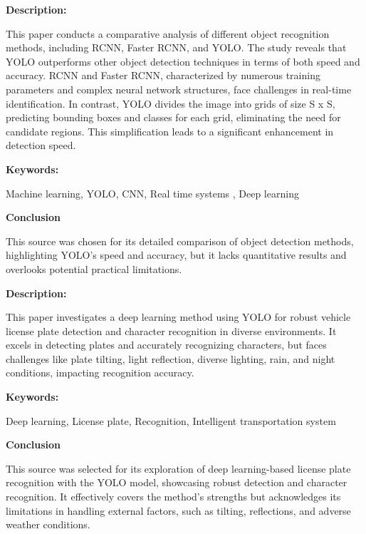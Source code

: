 %
%
%
%




{ 
	
	\textbf{Description:}
	
	This paper conducts a comparative analysis of different object recognition methods, including RCNN, Faster RCNN, and YOLO. The study reveals that YOLO outperforms other object detection techniques in terms of both speed and accuracy. RCNN and Faster RCNN, characterized by numerous training parameters and complex neural network structures, face challenges in real-time identification. In contrast, YOLO divides the image into grids of size S x S, predicting bounding boxes and classes for each grid, eliminating the need for candidate regions. This simplification leads to a significant enhancement in detection speed.\autocite{Xie:2018}

	
	\textbf{Keywords:} 
	
	Machine learning, YOLO, CNN, Real time systems , Deep learning
	
	\textbf{Conclusion} 
	
	This source was chosen for its detailed comparison of object detection methods, highlighting YOLO's speed and accuracy, but it lacks quantitative results and overlooks potential practical limitations.
	}



{ 
	
	\textbf{Description:}
	
	This paper investigates a deep learning method using YOLO for robust vehicle license plate detection and character recognition in diverse environments. It excels in detecting plates and accurately recognizing characters, but faces challenges like plate tilting, light reflection, diverse lighting, rain, and night conditions, impacting recognition accuracy.\autocite{Garvi:2022} 
	
	
	\textbf{Keywords:} 
	
	 Deep learning, License plate, Recognition, Intelligent transportation system

	
	\textbf{Conclusion } 
	
	This source was selected for its exploration of deep learning-based license plate recognition with the YOLO model, showcasing robust detection and character recognition. It effectively covers the method's strengths but acknowledges its limitations in handling external factors, such as tilting, reflections, and adverse weather conditions.

	}

